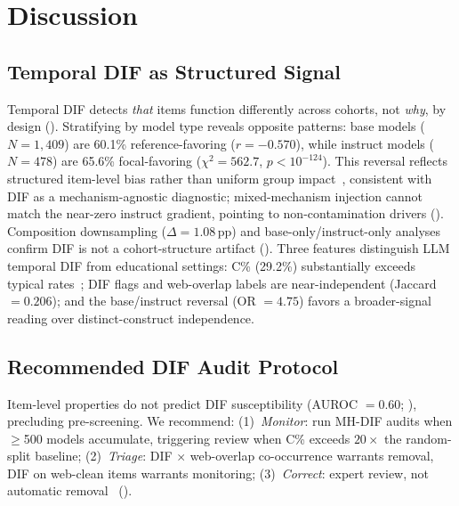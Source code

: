 \section{Discussion}
\label{sec:discussion}

\subsection{Temporal DIF as Structured Signal}
\label{sec:disc_temporal}

Temporal DIF detects \emph{that} items function differently across cohorts, not \emph{why}, by design (). Stratifying by model type reveals opposite patterns: base models ($N{=}1{,}409$) are 60.1\% reference-favoring ($r = -0.570$), while instruct models ($N{=}478$) are 65.6\% focal-favoring ($\chi^2 = 562.7$, $p < 10^{-124}$). This reversal reflects structured item-level bias rather than uniform group impact~\citep{camilli1994methods}, consistent with DIF as a mechanism-agnostic diagnostic; mixed-mechanism injection cannot match the near-zero instruct gradient, pointing to non-contamination drivers (). Composition downsampling ($\Delta = 1.08$\,pp) and base-only/instruct-only analyses confirm DIF is not a cohort-structure artifact (). Three features distinguish LLM temporal DIF from educational settings: C\% (29.2\%) substantially exceeds typical rates~\citep{clauser1998dif}; DIF flags and web-overlap labels are near-independent (Jaccard $= 0.206$); and the base/instruct reversal (OR $= 4.75$) favors a broader-signal reading over distinct-construct independence.

\subsection{Recommended DIF Audit Protocol}
\label{sec:disc_protocol}

Item-level properties do not predict DIF susceptibility (AUROC $= 0.60$; ), precluding pre-screening. We recommend: (1)~\emph{Monitor}: run MH-DIF audits when ${\geq}$500 models accumulate, triggering review when C\% exceeds $20\times$ the random-split baseline; (2)~\emph{Triage}: DIF $\times$ web-overlap co-occurrence warrants removal, DIF on web-clean items warrants monitoring; (3)~\emph{Correct}: expert review, not automatic removal~\citep{camilli1994methods,penfield2007dif} ().
